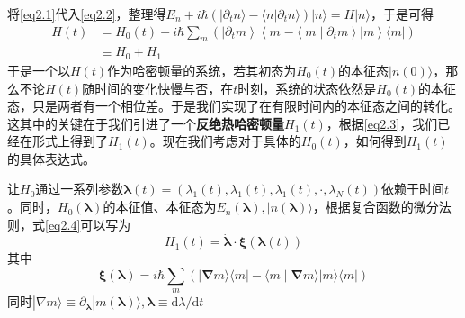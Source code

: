 将\eqref{eq2.1}代入\eqref{eq2.2}，整理得$ E_{n}+ i \hbar \left( | \partial_{t} n \rangle -\langle n | \partial_t n \rangle\right)|n\rangle=H| n\rangle$，于是可得
\begin{equation}
    \begin{split}
        H(t)&=H_{0}(t)+i \hbar \sum_{m}\left(\left|\partial_{t} m\right\rangle\left\langle m\left|-\left\langle m \mid \partial_{t} m\right\rangle\right| m\right\rangle\langle m|\right) \\
        &\equiv H_0 + H_1
    \end{split}
    \label{eq2.3}
\end{equation}
于是一个以$H (t)$作为哈密顿量的系统，若其初态为$H_0 (t)$的本征态$| n(0) \rangle$，那么不论$H (t)$随时间的变化快慢与否，在$t$时刻，系统的状态依然是$H_0 (t)$的本征态，只是两者有一个相位差。于是我们实现了在有限时间内的本征态之间的转化。这其中的关键在于我们引进了一个\textbf{反绝热哈密顿量}$H_1 (t)$，根据\eqref{eq2.3}，我们已经在形式上得到了$H_1 (t)$。现在我们考虑对于具体的$H_0 (t)$，如何得到$H_1 (t)$的具体表达式。\cite{Jarzynski2013}

让$H_0$通过一系列参数$\bm{\lambda}(t)=\left( \lambda_1 (t) , \lambda_1 (t) , \lambda_1 (t) , \cdot , \lambda_{N} (t) \right)$依赖于时间$t$。同时，$H_0 (\bm{\lambda})$的本征值、本征态为$E_n (\bm{\lambda}), | n (\bm{\lambda}) \rangle$，根据复合函数的微分法则，式\eqref{eq2.4}可以写为
\begin{equation}
    H_1 (t)=\dot{\boldsymbol{\lambda}} \cdot \boldsymbol{\xi}(\boldsymbol{\lambda}(t))
    \label{eq2.5}
\end{equation}
其中
\begin{equation}
    \boldsymbol{\xi}(\boldsymbol{\lambda})=i \hbar \sum_{m}(|\boldsymbol{\nabla} m\rangle\langle m|-\langle m \mid \boldsymbol{\nabla} m\rangle| m\rangle\langle m|)
    \label{eq2.4}
\end{equation}
同时$|\nabla m\rangle \equiv \partial_{\boldsymbol{\lambda}}|m(\boldsymbol{\lambda})\rangle  , \dot{\boldsymbol{\lambda}} \equiv \mathrm{d} \lambda / \mathrm{d} t$


